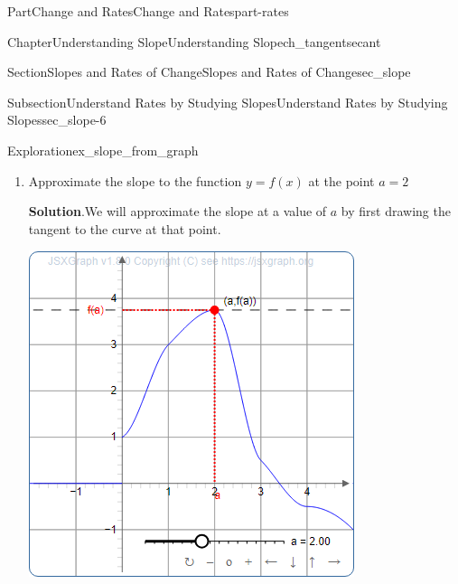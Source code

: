 \documentclass[oneside,10pt,]{tufte-book}
\newcommand{\blocktitlefont}{\relax}
\numberwithin{equation}{chapter}
\begin{document}
\begin{partptx}{Part}{Change and Rates}{}{Change and Rates}{}{}{part-rates}
\begin{chapterptx}{Chapter}{Understanding Slope}{}{Understanding Slope}{}{}{ch_tangentsecant}
\begin{sectionptx}{Section}{Slopes and Rates of Change}{}{Slopes and Rates of Change}{}{}{sec_slope}
\begin{subsectionptx}{Subsection}{Understand Rates by Studying Slopes}{}{Understand Rates by Studying Slopes}{}{}{sec_slope-6}
\begin{exploration}{Exploration}{}{ex_slope_from_graph}
\begin{enumerate}[font=\bfseries,label=(\alph*),ref=\alph*]
\begin{equation*}
m = \dfrac{3-2}{1-0} = \dfrac{1}{1} = 1
\end{equation*}
Therefore, the slope of \(f(x)\) at \(a=1\) is equal to 1.%
\item{}Approximate the slope to the function \(y=f(x)\) at the point \(a=2\)%
\par\smallskip%
\noindent\textbf{\blocktitlefont Solution}.\hypertarget{ex_slope_from_graph-3-2}{}\quad{}We will approximate the slope at a value of \(a\) by first drawing the tangent to the curve at that point.%
\begin{sidebyside}{2}{0.075}{0.075}{0.17}%
\begin{sbspanel}{0.47}%
\includegraphics[width=\linewidth]{generated/preview/ex_slope_from_graph-3-2-2-preview.png}
\end{sbspanel}%
\begin{sbspanel}{0.21}%

\end{sbspanel}
\end{sidebyside}
\end{enumerate}
\end{exploration}
\end{subsectionptx}
\end{sectionptx}
\end{chapterptx}
\end{partptx}
\end{document}
